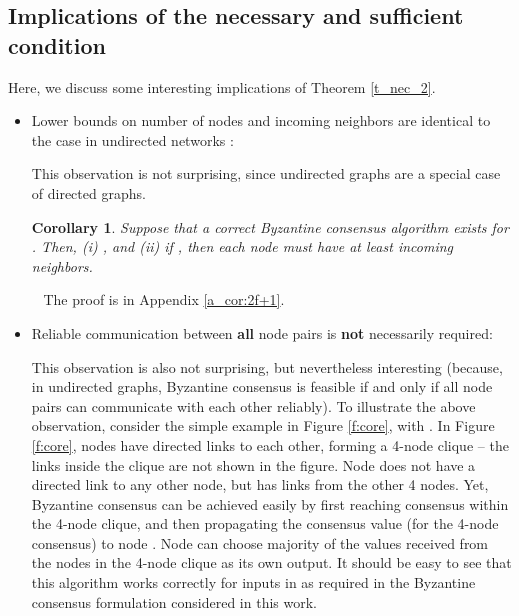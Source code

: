 \documentclass[letterpaper, 11pt]{article}
\newenvironment{proof}{\noindent {\bf Proof:}~}{\hspace*{\fill}}
\newtheorem{corollary}{Corollary}
\begin{document}
\subsection{Implications of the necessary and sufficient condition}
\label{s_discussion}

Here, we discuss some interesting implications of Theorem \ref{t_nec_2}.

\begin{itemize}
\item Lower bounds on number of nodes and incoming neighbors are identical to the case in undirected networks \cite{impossible_proof_lynch,dolev_82_BG,welch_book}:

This observation is not surprising, since undirected graphs are a special case of directed graphs.

\begin{corollary}
\label{cor:2f+1}
Suppose that a correct Byzantine consensus algorithm exists for
.
Then,
 (i) , and
 (ii) if , then each node must have at least  incoming neighbors.
\end{corollary}
\begin{proof}
The proof is in Appendix \ref{a_cor:2f+1}.
\end{proof}





\item Reliable communication between {\bf all} node pairs is {\bf not} necessarily required:

This observation is also not surprising, but nevertheless
interesting (because, in undirected graphs, Byzantine consensus
is feasible if and only if all node pairs can communicate with each
other reliably). To illustrate the above observation, consider the simple
example in Figure \ref{f:core}, with . In Figure \ref{f:core},
nodes  have directed links to each other, forming a 4-node
clique -- the links inside the clique are not shown in the figure. Node  does not have a directed link to any other node, but has links from the
other 4 nodes.
Yet, Byzantine consensus can be achieved easily by first reaching consensus within the
4-node clique, and then propagating the consensus value (for the 4-node consensus) to node .  
Node  can choose majority of the values received from the nodes in the
4-node clique as its own output.
It should be easy to see that this algorithm works correctly for inputs in  as
required in the Byzantine consensus formulation considered in this work.

\vspace*{-40pt}
\begin{figure}[hbtp!]
\centering




\end{figure}
\end{itemize}
\end{document}
